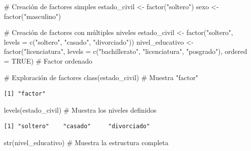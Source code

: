 \documentclass[
  spanish,
  a4paper,
  DIV=11,
  numbers=noendperiod,
  onepage,
  openany]{scrreprt}
\newenvironment{Shaded}{\begin{snugshade}}{\end{snugshade}}
\newcommand{\AttributeTok}[1]{\textcolor[rgb]{0.40,0.45,0.13}{#1}}
\newcommand{\CommentTok}[1]{\textcolor[rgb]{0.37,0.37,0.37}{#1}}
\newcommand{\ConstantTok}[1]{\textcolor[rgb]{0.56,0.35,0.01}{#1}}
\newcommand{\FunctionTok}[1]{\textcolor[rgb]{0.28,0.35,0.67}{#1}}
\newcommand{\NormalTok}[1]{\textcolor[rgb]{0.00,0.23,0.31}{#1}}
\newcommand{\OtherTok}[1]{\textcolor[rgb]{0.00,0.23,0.31}{#1}}
\newcommand{\StringTok}[1]{\textcolor[rgb]{0.13,0.47,0.30}{#1}}
\begin{document}
\begin{Shaded}
\begin{Highlighting}[]
\CommentTok{\# Creación de factores simples}
\NormalTok{estado\_civil }\OtherTok{\textless{}{-}} \FunctionTok{factor}\NormalTok{(}\StringTok{"soltero"}\NormalTok{)}
\NormalTok{sexo }\OtherTok{\textless{}{-}} \FunctionTok{factor}\NormalTok{(}\StringTok{"masculino"}\NormalTok{)}

\CommentTok{\# Creación de factores con múltiples niveles}
\NormalTok{estado\_civil }\OtherTok{\textless{}{-}} \FunctionTok{factor}\NormalTok{(}\StringTok{"soltero"}\NormalTok{, }
                      \AttributeTok{levels =} \FunctionTok{c}\NormalTok{(}\StringTok{"soltero"}\NormalTok{, }\StringTok{"casado"}\NormalTok{, }\StringTok{"divorciado"}\NormalTok{))}
\NormalTok{nivel\_educativo }\OtherTok{\textless{}{-}} \FunctionTok{factor}\NormalTok{(}\StringTok{"licenciatura"}\NormalTok{,}
                         \AttributeTok{levels =} \FunctionTok{c}\NormalTok{(}\StringTok{"bachillerato"}\NormalTok{,}
                                    \StringTok{"licenciatura"}\NormalTok{,}
                                    \StringTok{"posgrado"}\NormalTok{),}
                         \AttributeTok{ordered =} \ConstantTok{TRUE}\NormalTok{)  }\CommentTok{\# Factor ordenado}

\CommentTok{\# Exploración de factores}
\FunctionTok{class}\NormalTok{(estado\_civil)     }\CommentTok{\# Muestra "factor"}
\end{Highlighting}
\end{Shaded}

\begin{verbatim}
[1] "factor"
\end{verbatim}

\begin{Shaded}
\begin{Highlighting}[]
\FunctionTok{levels}\NormalTok{(estado\_civil)    }\CommentTok{\# Muestra los niveles definidos}
\end{Highlighting}
\end{Shaded}

\begin{verbatim}
[1] "soltero"    "casado"     "divorciado"
\end{verbatim}

\begin{Shaded}
\begin{Highlighting}[]
\FunctionTok{str}\NormalTok{(nivel\_educativo)    }\CommentTok{\# Muestra la estructura completa}
\end{Highlighting}
\end{Shaded}
\end{document}
